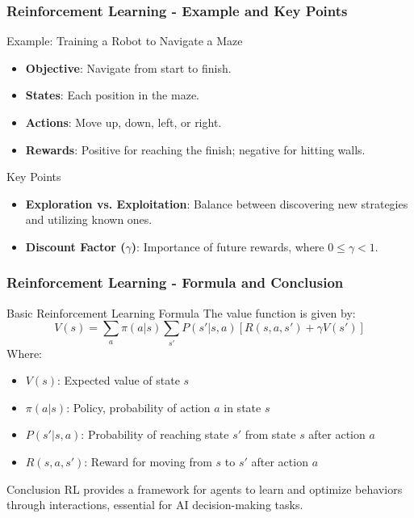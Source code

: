 \documentclass[aspectratio=169]{beamer}
\begin{document}
\begin{frame}[fragile]
    \frametitle{Reinforcement Learning - Example and Key Points}
    \begin{block}{Example: Training a Robot to Navigate a Maze}
        \begin{itemize}
            \item \textbf{Objective}: Navigate from start to finish.
            \item \textbf{States}: Each position in the maze.
            \item \textbf{Actions}: Move up, down, left, or right.
            \item \textbf{Rewards}: Positive for reaching the finish; negative for hitting walls.
        \end{itemize}
    \end{block}
    
    \begin{block}{Key Points}
        \begin{itemize}
            \item \textbf{Exploration vs. Exploitation}: Balance between discovering new strategies and utilizing known ones.
            \item \textbf{Discount Factor ($\gamma$)}: Importance of future rewards, where $0 \leq \gamma < 1$.
        \end{itemize}
    \end{block}
\end{frame}

\begin{frame}[fragile]
    \frametitle{Reinforcement Learning - Formula and Conclusion}
    \begin{block}{Basic Reinforcement Learning Formula}
        The value function is given by:
        \begin{equation}
            V(s) = \sum_a \pi(a|s) \sum_{s'} P(s'|s, a) [R(s, a, s') + \gamma V(s')]
        \end{equation}
        Where:
        \begin{itemize}
            \item $V(s)$: Expected value of state $s$
            \item $\pi(a|s)$: Policy, probability of action $a$ in state $s$
            \item $P(s'|s, a)$: Probability of reaching state $s'$ from state $s$ after action $a$
            \item $R(s, a, s')$: Reward for moving from $s$ to $s'$ after action $a$
        \end{itemize}
    \end{block}
    
    \begin{block}{Conclusion}
        RL provides a framework for agents to learn and optimize behaviors through interactions, essential for AI decision-making tasks.
    \end{block}
\end{frame}
\end{document}
